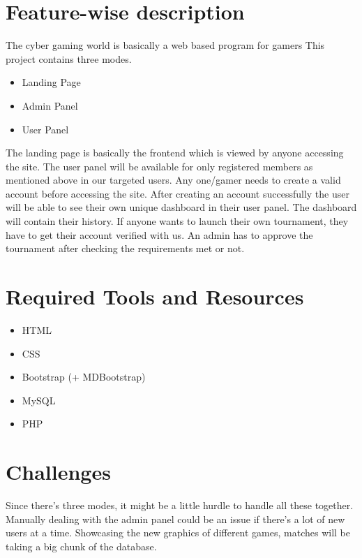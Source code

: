 \documentclass[11pt]{report}
\begin{document}
\section*{Feature-wise description}
The cyber gaming world is basically a web based program for gamers This project contains three modes. 
\begin{itemize}
\item Landing Page
\end{itemize}
\begin{itemize}
\item Admin Panel
\item User Panel
\end{itemize}
The landing page is basically the frontend which is viewed by anyone accessing the site. The user panel will be available for only registered members as mentioned above in our targeted users. Any one/gamer needs to create a valid account before accessing the site. After creating an account successfully the user will be able to see their own unique dashboard in their user panel. The dashboard will contain their history. If anyone wants to launch their own tournament, they have to get their account verified with us. An admin has to approve the tournament after checking the requirements met or not. 


\section*{Required Tools and Resources}

\begin{itemize}
\item HTML
\item CSS
\item Bootstrap (+ MDBootstrap)
\item MySQL
\item PHP
\end{itemize}


\section*{Challenges}

Since there's three modes, it might be a little hurdle to handle all these together. Manually dealing with the admin panel could be an issue if there's a lot of new users at a time. Showcasing the new graphics of different games, matches will be taking a big chunk of the database.


\newpage
\printbibliography
\end{document}
